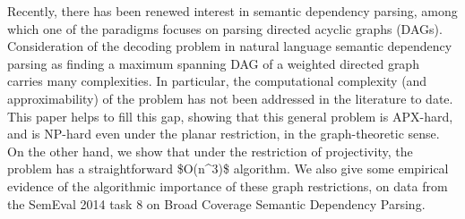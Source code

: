 Recently, there has been renewed interest in semantic dependency parsing, among which one of the paradigms focuses on parsing directed acyclic graphs (DAGs). Consideration of the decoding problem in natural language semantic dependency parsing as finding a maximum spanning DAG of a weighted directed graph carries many complexities.  In particular, the computational complexity (and approximability) of the problem has not been addressed in the literature to date.  This paper helps to fill this gap, showing that this general problem is \textsf{APX}-hard, and is \textsf{NP}-hard even under the planar restriction, in the graph-theoretic sense.  On the other hand, we show that under the restriction of projectivity, the problem has a straightforward \$O(n^3)\$ algorithm. We also give some empirical evidence of the algorithmic importance of these graph restrictions, on data from the SemEval 2014 task 8 on Broad Coverage Semantic Dependency Parsing.
